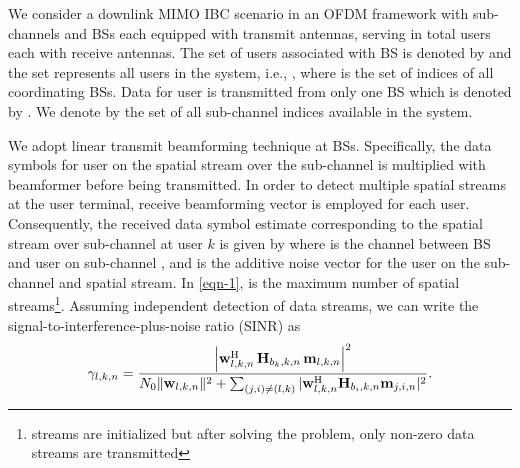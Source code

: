 We consider a downlink \ac{MIMO} \ac{IBC} scenario in an \ac{OFDM} framework with  sub-channels and  \acp{BS} each equipped with  transmit antennas, serving in total  users each with  receive antennas. The set of users associated with \ac{BS}  is denoted by  and the set  represents all users in the system, i.e., , where  is the set of indices of all coordinating \acp{BS}. Data for user  is transmitted from only one \ac{BS} which is denoted by . We denote by  the set of all sub-channel indices available in the system.

We adopt linear transmit beamforming technique at \acp{BS}. Specifically, the data symbols  for  user  on the  spatial stream over the sub-channel  is multiplied with beamformer  before being transmitted. In order to detect  multiple spatial streams at the user terminal, receive beamforming vector  is employed for each user. Consequently, the received data symbol estimate corresponding to the  spatial stream over sub-channel  at user $k$ is given by
\iftoggle{single_column}{
\begin{equation}\label{eqn-1}
\hat{d}_{l,k,n} = \mvec{w}{l,k,n}^\herm \mvec{H}{b_k,k,n} \,\mvec{m}{l,k,n} d_{l,k,n} + \mvec{w}{l,k,n}^\herm \sum_{i \in \mc{U} \backslash \set{k}} \mvec{H}{b_i,k,n} \sum_{j = 1}^L \mvec{m}{j,i,n}d_{j,i,n} + \mvec{w}{l,k,n}^\herm \mvec{n}{k,n},
\end{equation}
}{
\begin{multline}\label{eqn-1}
\hat{d}_{l,k,n} = \mvec{w}{l,k,n}^\herm \mvec{H}{b_k,k,n} \,\mvec{m}{l,k,n} d_{l,k,n} + \mvec{w}{l,k,n}^\herm \mvec{n}{k,n} \\ 
+ \mvec{w}{l,k,n}^\herm \sum_{i \in \mc{U} \backslash \set{k}} \mvec{H}{b_i,k,n} \sum_{j = 1}^L \mvec{m}{j,i,n}d_{j,i,n},
\end{multline}
}
where  is the channel between \ac{BS}  and  user  on sub-channel , and   is the additive noise vector for the user  on the  sub-channel and  spatial stream. In \eqref{eqn-1},  is the maximum number of spatial streams\footnote{ streams are initialized but after solving the problem, only  non-zero data streams are transmitted}. Assuming independent detection of data streams, we can write the signal-to-interference-plus-noise ratio (SINR) as
\begin{equation}\label{eq:SINR}
\gamma_{l,k,n} = \dfrac{\left |\mvec{w}{l,k,n}^\herm \, \mvec{H}{b_k,k,n} \, \mvec{m}{l,k,n} \right |^2}{N_0\|\mvec{w}{l,k,n}\|^2 + \sum_{(j,i) \neq (l,k)} |\mvec{w}{l,k,n}^\herm \mvec{H}{b_i,k,n} \mvec{m}{j,i,n} |^2}.
\end{equation}

